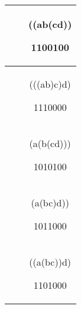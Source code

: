 \documentclass[10pt,letter]{article}
\begin{document}
\begin{longtable}[]{@{}ccc@{}}
\toprule
\begin{minipage}[b]{0.32\columnwidth}\centering\strut
\strut
\end{minipage} & \begin{minipage}[b]{0.32\columnwidth}\centering\strut
\strut
\end{minipage} & \begin{minipage}[b]{0.32\columnwidth}\centering\strut
((ab(cd))

1100100\strut
\end{minipage}\tabularnewline
\midrule
\endhead
\begin{minipage}[t]{0.32\columnwidth}\centering\strut
\strut
\end{minipage} & \begin{minipage}[t]{0.32\columnwidth}\centering\strut
\strut
\end{minipage} & \begin{minipage}[t]{0.32\columnwidth}\centering\strut
(((ab)c)d)

1110000\strut
\end{minipage}\tabularnewline
\begin{minipage}[t]{0.32\columnwidth}\centering\strut
\strut
\end{minipage} & \begin{minipage}[t]{0.32\columnwidth}\centering\strut
\strut
\end{minipage} & \begin{minipage}[t]{0.32\columnwidth}\centering\strut
(a(b(cd)))

1010100\strut
\end{minipage}\tabularnewline
\begin{minipage}[t]{0.32\columnwidth}\centering\strut
\strut
\end{minipage} & \begin{minipage}[t]{0.32\columnwidth}\centering\strut
\strut
\end{minipage} & \begin{minipage}[t]{0.32\columnwidth}\centering\strut
(a(bc)d))

1011000\strut
\end{minipage}\tabularnewline
\begin{minipage}[t]{0.32\columnwidth}\centering\strut
\strut
\end{minipage} & \begin{minipage}[t]{0.32\columnwidth}\centering\strut
\strut
\end{minipage} & \begin{minipage}[t]{0.32\columnwidth}\centering\strut
((a(bc))d)

1101000\strut
\end{minipage}\tabularnewline
\bottomrule

\end{longtable}
\end{document}
